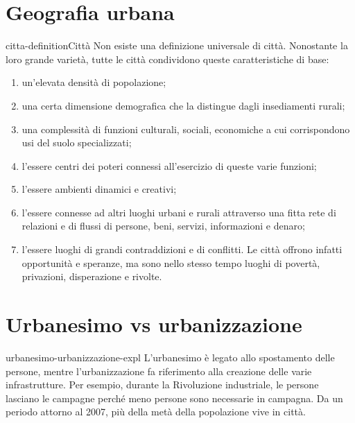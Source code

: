 \documentclass[preview]{standalone}
\begin{document}
\genpage

\section{Geografia urbana}

\begin{snippetdefinition}{citta-definition}{Città}
    Non esiste una definizione universale di città.
    Nonostante la loro grande varietà, tutte le città condividono queste
    caratteristiche di base:
    \begin{enumerate}
        \item un'elevata densità di popolazione;
        \item una certa dimensione demografica che la distingue dagli
        insediamenti rurali;
        \item una complessità di funzioni culturali, sociali, economiche a cui
        corrispondono usi del suolo specializzati;
        \item l'essere centri dei poteri connessi all'esercizio di queste varie
        funzioni;
        \item l'essere ambienti dinamici e creativi;
        \item l'essere connesse ad altri luoghi urbani e rurali attraverso una
        fitta rete di relazioni e di flussi di persone, beni, servizi,
        informazioni e denaro;
        \item l'essere luoghi di grandi contraddizioni e di conflitti. Le città
        offrono infatti opportunità e speranze, ma sono nello stesso
        tempo luoghi di povertà, privazioni, disperazione e rivolte.
    \end{enumerate}
\end{snippetdefinition}

\section{Urbanesimo vs urbanizzazione}

\begin{snippet}{urbanesimo-urbanizzazione-expl}
    L'urbanesimo è legato allo spostamento delle persone,
    mentre l'urbanizzazione fa riferimento alla creazione delle varie infrastrutture.
    Per esempio, durante la Rivoluzione industriale, le persone lasciano le campagne
    perché meno persone sono necessarie in campagna.
    Da un periodo attorno al 2007, più della metà della popolazione vive in città.
\end{snippet}
\end{document}

